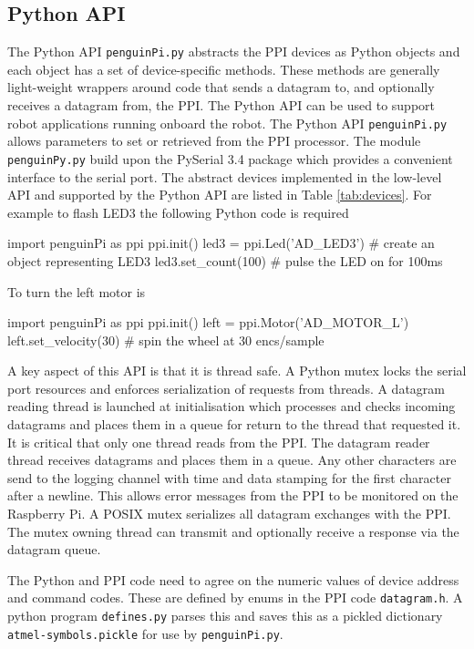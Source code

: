 \documentclass[11pt,fleqn]{article}
\begin{document}
\subsection{Python API}
The Python API \texttt{penguinPi.py} abstracts the PPI devices as Python objects and each object has a set of device-specific methods.  These methods are generally light-weight
wrappers around code that sends a datagram to,   and optionally receives a datagram from, the PPI.
The Python API can be used to support robot applications running onboard the robot. 
The Python API \texttt{penguinPi.py} allows parameters to set or retrieved from the PPI processor.  
The module \texttt{penguinPy.py} build upon the PySerial 3.4 package which provides a convenient interface to the serial port.
The abstract devices implemented in the low-level API and supported by the Python API are listed in Table \ref{tab:devices}.  For example to flash LED3 the following
Python code is required
\begin{Code}
import penguinPi as ppi
ppi.init()
led3 = ppi.Led('AD_LED3')  # create an object representing LED3
led3.set_count(100)      # pulse the LED on for 100ms
\end{Code}

To turn the left motor is
\begin{Code}
import penguinPi as ppi
ppi.init()
left = ppi.Motor('AD_MOTOR_L')
left.set_velocity(30)  # spin the wheel at 30 encs/sample
\end{Code}

A key aspect of this API is that it is thread safe.  A Python mutex locks the serial port resources and enforces serialization of 
requests from threads.  A datagram reading thread is launched at initialisation which processes and checks incoming datagrams and
places them in a queue for return to the thread that requested it.
It is critical that only one thread reads from the PPI.  The datagram reader thread receives datagrams and places them in a queue.  Any other characters are send to the logging channel
with time and data stamping for the first character after a newline.  This allows error messages from the PPI to be monitored on the
Raspberry Pi.
 A POSIX mutex serializes all datagram exchanges with the PPI.  The mutex owning thread can transmit and optionally receive
a response via the datagram queue.

The Python and PPI code need to agree on the numeric values of device address and command codes.  These are defined by enums
in the PPI code \texttt{datagram.h}.  A python program \texttt{defines.py} parses this and saves this as a pickled dictionary \texttt{atmel-symbols.pickle} for use by \texttt{penguinPi.py}. 
\end{document}
